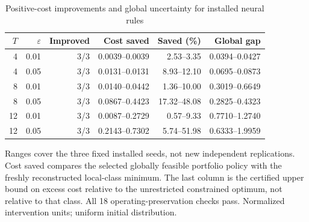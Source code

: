 \begin{table}[htbp]
\centering\footnotesize
\caption{Positive-cost improvements and global uncertainty for installed neural rules}\label{tab:global-neural}
\begin{tabular}{rrrrrr}\toprule
$T$ & $\varepsilon$ & Improved & Cost saved & Saved (\%) & Global gap \\\midrule
4 & 0.01 & 3/3 & 0.0039--0.0039 & 2.53--3.35 & 0.0394--0.0427 \\
4 & 0.05 & 3/3 & 0.0131--0.0131 & 8.93--12.10 & 0.0695--0.0873 \\
8 & 0.01 & 3/3 & 0.0140--0.0442 & 1.36--10.00 & 0.3019--0.6649 \\
8 & 0.05 & 3/3 & 0.0867--0.4423 & 17.32--48.08 & 0.2825--0.4323 \\
12 & 0.01 & 3/3 & 0.0087--0.2729 & 0.57--9.33 & 0.7710--1.2740 \\
12 & 0.05 & 3/3 & 0.2143--0.7302 & 5.74--51.98 & 0.6333--1.9959 \\
\bottomrule\end{tabular}
\par\smallskip\begin{minipage}{.98\textwidth}\footnotesize Ranges cover the three fixed installed seeds, not new independent replications. Cost saved compares the selected globally feasible portfolio policy with the freshly reconstructed local-class minimum. The last column is the certified upper bound on excess cost relative to the unrestricted constrained optimum, not relative to that class. All 18 operating-preservation checks pass. Normalized intervention units; uniform initial distribution.\end{minipage}
\end{table}
